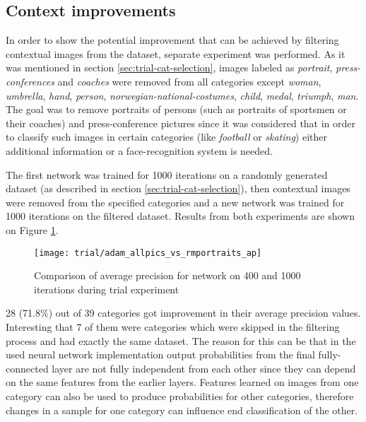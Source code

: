 \subsection{Context improvements}
    In order to show the potential improvement that can be achieved by filtering contextual images from the dataset, separate experiment was performed. As it was mentioned in section \ref{sec:trial-cat-selection}, images labeled as \textit{portrait}, \textit{press-conferences} and \textit{coaches} were removed from all categories except \textit{woman}, \textit{umbrella}, \textit{hand}, \textit{person}, \textit{norwegian-national-costumes}, \textit{child}, \textit{medal}, \textit{triumph}, \textit{man}. The goal was to remove portraits of persons (such as portraits of sportsmen or their coaches) and press-conference pictures since it was considered that in order to classify such images in certain categories (like \textit{football} or \textit{skating}) either additional information or a face-recognition system is needed.
    
    The first network was trained for 1000 iterations on a randomly generated dataset (as described in section \ref{sec:trial-cat-selection}), then contextual images were removed from the specified categories and a new network was trained for 1000 iterations on the filtered dataset. Results from both experiments are shown on Figure \ref{fig:trial-allpics-vs-rmportraits}.
    
    \begin{figure}[H]
        \centering
        \texttt{[image: trial/adam\_allpics\_vs\_rmportraits\_ap]}
        \caption{Comparison of average precision for network on 400 and 1000 iterations during trial experiment}
        \label{fig:trial-allpics-vs-rmportraits}
    \end{figure}
    
    28 (71.8\%) out of 39 categories got improvement in their average precision values. Interesting that 7 of them were categories which were skipped in the filtering process and had exactly the same dataset. The reason for this can be that in the used neural network implementation output probabilities from the final fully-connected layer are not fully independent from each other since they can depend on the same features from the earlier layers. Features learned on images from one category can also be used to produce probabilities for other categories, therefore changes in a sample for one category can influence end classification of the other.
    
